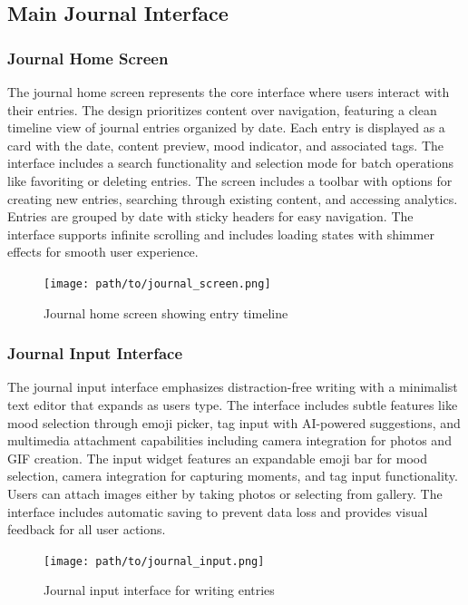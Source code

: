 \subsection{Main Journal Interface}

\subsubsection{Journal Home Screen}

The journal home screen represents the core interface where users interact with their entries. The design prioritizes content over navigation, featuring a clean timeline view of journal entries organized by date. Each entry is displayed as a card with the date, content preview, mood indicator, and associated tags. The interface includes a search functionality and selection mode for batch operations like favoriting or deleting entries. The screen includes a toolbar with options for creating new entries, searching through existing content, and accessing analytics. Entries are grouped by date with sticky headers for easy navigation. The interface supports infinite scrolling and includes loading states with shimmer effects for smooth user experience.

\begin{figure}[H]
\centering
\texttt{[image: path/to/journal\_screen.png]}
\caption{Journal home screen showing entry timeline}
\label{fig:journal-screen}
\end{figure}

\subsubsection{Journal Input Interface}

The journal input interface emphasizes distraction-free writing with a minimalist text editor that expands as users type. The interface includes subtle features like mood selection through emoji picker, tag input with AI-powered suggestions, and multimedia attachment capabilities including camera integration for photos and GIF creation. The input widget features an expandable emoji bar for mood selection, camera integration for capturing moments, and tag input functionality. Users can attach images either by taking photos or selecting from gallery. The interface includes automatic saving to prevent data loss and provides visual feedback for all user actions.

\begin{figure}[H]
\centering
\texttt{[image: path/to/journal\_input.png]}
\caption{Journal input interface for writing entries}
\label{fig:journal-input}
\end{figure}

